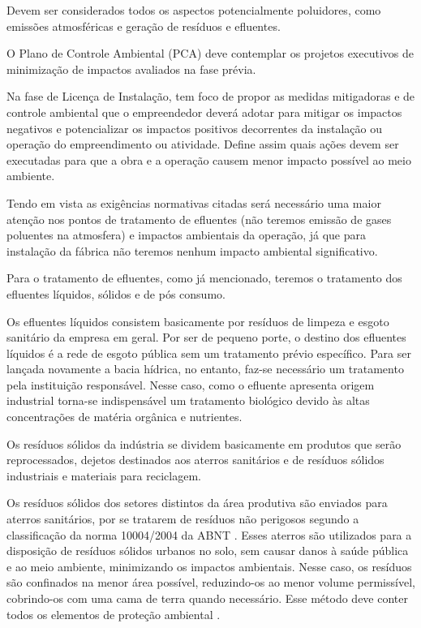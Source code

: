 \documentclass[
	12pt,				%
	openright,			%
	oneside,			%
	a4paper,			%
	english,			%
	french,				%
	spanish,			%
	brazil				%
	]{abntex2}
\begin{document}
Devem ser considerados todos os aspectos potencialmente poluidores, como emissões atmosféricas e geração de resíduos e efluentes.

O Plano de Controle Ambiental (PCA) deve contemplar os projetos executivos de minimização de impactos avaliados na fase prévia.

Na fase de Licença de Instalação, tem foco de propor as medidas mitigadoras e de controle ambiental que o empreendedor deverá adotar para mitigar os impactos negativos e potencializar os impactos positivos decorrentes da instalação ou operação do empreendimento ou atividade. Define assim quais ações devem ser executadas para que a obra e a operação causem menor impacto possível ao meio ambiente.

Tendo em vista as exigências normativas citadas será necessário uma maior atenção nos pontos de tratamento de efluentes (não teremos emissão de gases poluentes na atmosfera) e impactos ambientais da operação, já que para instalação da fábrica não teremos nenhum impacto ambiental significativo.

Para o tratamento de efluentes, como já mencionado, teremos o tratamento dos efluentes líquidos, sólidos e de pós consumo.

Os efluentes líquidos consistem basicamente por resíduos de limpeza e esgoto
sanitário da empresa em geral. Por ser de pequeno porte, o destino dos efluentes líquidos é a rede de esgoto pública sem um tratamento prévio específico. Para ser lançada novamente a bacia hídrica, no entanto, faz-se necessário um tratamento pela instituição responsável. Nesse caso, como o efluente apresenta origem industrial torna-se indispensável um tratamento biológico devido às altas concentrações de matéria orgânica e nutrientes.

Os resíduos sólidos da indústria se dividem basicamente em produtos que serão
reprocessados, dejetos destinados aos aterros sanitários e de resíduos sólidos industriais e
materiais para reciclagem.

Os resíduos sólidos dos setores distintos da área produtiva são enviados para aterros
sanitários, por se tratarem de resíduos não perigosos segundo a classificação da norma
10004/2004 da ABNT \cite{ABNT}. Esses aterros são utilizados para a disposição de
resíduos sólidos urbanos no solo, sem causar danos à saúde pública e ao meio ambiente,
minimizando os impactos ambientais. Nesse caso, os resíduos são confinados na menor área
possível, reduzindo-os ao menor volume permissível, cobrindo-os com uma cama de terra
quando necessário. Esse método deve conter todos os elementos de proteção ambiental
\cite{FEAM}.
\end{document}
